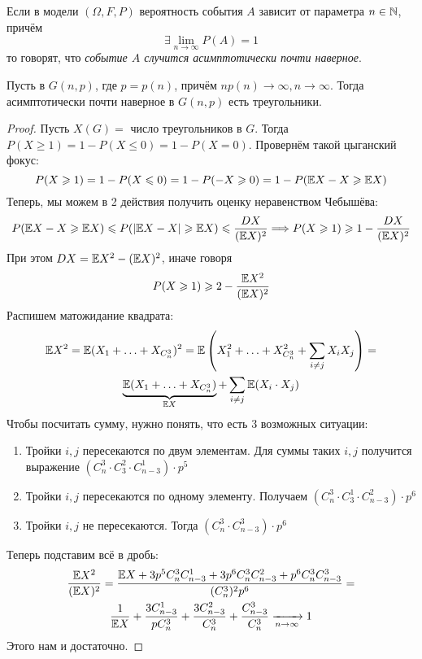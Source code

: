 \begin{definition}
	Если в модели $(\Omega, F, P)$ вероятность события $A$ зависит от параметра $n \in \mathbb{N}$, причём
	\[
		\exists \lim_{n \to \infty} P(A) = 1
	\]
	то говорят, что \textit{событие $A$ случится асимптотически почти наверное}.
\end{definition}

\begin{theorem}
	Пусть в $G(n, p)$, где $p = p(n)$, причём $np(n) \to \infty, n \to \infty$. Тогда асимптотически почти наверное в $G(n, p)$ есть треугольники.
\end{theorem}

\begin{proof}
	Пусть $X(G) = $ число треугольников в $G$. Тогда $P(X \ge 1) = 1 - P(X \le 0) = 1 - P(X = 0)$.  Провернём такой цыганский фокус:
	\[
		P(X \geqslant 1) = 1 - P(X \leqslant 0) = 1 - P(-X \geqslant 0) = 1 - P(\mathbb{E} X - X \geqslant \mathbb{E} X)
	\]
	Теперь, мы можем в 2 действия получить оценку неравенством Чебышёва:
	\[
		P(\mathbb{E} X - X \geqslant \mathbb{E} X) \leqslant P(|\mathbb{E} X - X| \geqslant \mathbb{E} X) \leqslant \frac{DX}{(\mathbb{E} X)^2} \Longrightarrow P(X \geqslant 1) \geqslant 1 - \frac{DX}{(\mathbb{E} X)^2}
	\]
	При этом $DX = \mathbb{E} X^2 - (\mathbb{E} X)^2$, иначе говоря
	\[
		P(X \geqslant 1) \geqslant 2 - \frac{\mathbb{E} X^2}{(\mathbb{E} X)^2}
	\]
	Распишем матожидание квадрата:
	\begin{multline*}
		\mathbb{E} X^2 = \mathbb{E} (X_1 + \ldots + X_{C_n^3})^2 = \mathbb{E}\left(X_1^2 + \ldots + X_{C_n^3}^2 + \sum_{i \neq j} X_i X_j\right) =
		\\
		\underbrace{\mathbb{E}(X_1 + \ldots + X_{C_n^3})}_{\mathbb{E} X} + \sum_{i \neq j} \mathbb{E}(X_i \cdot X_j)
	\end{multline*}
	Чтобы посчитать сумму, нужно понять, что есть 3 возможных ситуации:
	\begin{enumerate}
		\item Тройки $i, j$ пересекаются по двум элементам. Для суммы таких $i, j$ получится выражение $(C_n^3 \cdot C_3^2 \cdot C_{n - 3}^1) \cdot p^5$
		
		\item Тройки $i, j$ пересекаются по одному элементу. Получаем $(C_n^3 \cdot C_3^1 \cdot C_{n - 3}^2) \cdot p^6$
		
		\item Тройки $i, j$ не пересекаются. Тогда $(C_n^3 \cdot C_{n - 3}^3) \cdot p^6$
	\end{enumerate}
	Теперь подставим всё в дробь:
	\begin{multline*}
		\frac{\mathbb{E} X^2}{(\mathbb{E} X)^2} = \frac{\mathbb{E} X + 3p^5 C_n^3 C_{n - 3}^1 + 3p^6 C_n^3 C_{n - 3}^2 + p^6 C_n^3 C_{n - 3}^3}{(C_n^3)^2 p^6} =
		\\
		\frac{1}{\mathbb{E} X} + \frac{3C_{n - 3}^1}{pC_n^3} + \frac{3C_{n - 3}^2}{C_n^3} + \frac{C_{n - 3}^3}{C_n^3} \xrightarrow[n \to \infty]{} 1
	\end{multline*}
	Этого нам и достаточно.
\end{proof}

